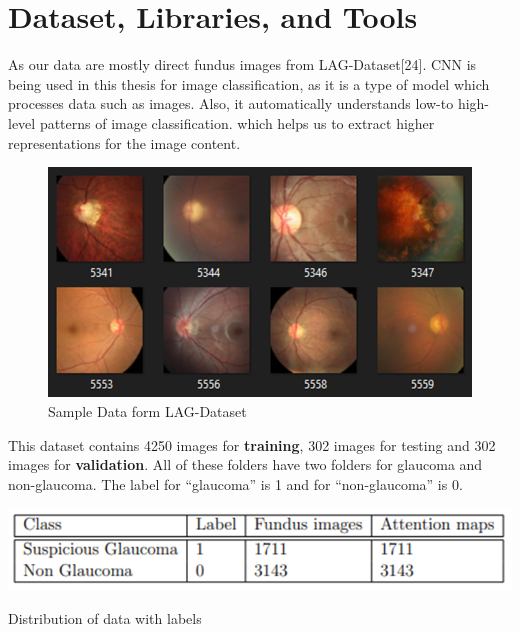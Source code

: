 \section{Dataset, Libraries, and Tools}
As our data are mostly direct fundus images from LAG-Dataset[24]. CNN is being used in this thesis for image classification, as it is a type of model which processes data such as images. Also, it automatically understands low-to high-level patterns of image classification. which helps us to extract higher representations for the image content.

\vspace{5mm}
\begin{figure}[htbp]
\centering
\includegraphics[scale=1]{images/fig-5.png}
\caption{Sample Data form LAG-Dataset}
\label{fig:x Sample Data form LAG-Dataset}
\end{figure}

\noindent This dataset contains 4250 images for \textbf{training}, 302 images for testing and 302 images for \textbf{validation}. All of these folders have two folders for glaucoma and non-glaucoma. The label for “glaucoma” is 1 and for “non-glaucoma” is 0.

\vspace{5mm}
\begin{table}[htbp]
\centering
\includegraphics[scale=1]{images/fig-6.png}
\caption{\label{tab:Distribution of data with labels}Distribution of data with labels}

\end{table}

